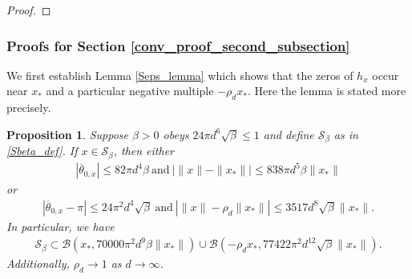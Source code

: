 \documentclass[11pt]{article}
\renewcommand{\epsilon}{\varepsilon}
\newcommand{\Seps}{\mathcal{S}}
\newtheorem{prop}{Proposition}
\theoremstyle{remark}
\begin{document}
\begin{proof}
\end{proof}



\subsubsection{Proofs for Section \ref{conv_proof_second_subsection}} \label{proofs_for_second_subsection}

We first establish Lemma \ref{Seps_lemma} which shows that the zeros of $h_x$ occur near $x_*$ and a particular negative multiple $-\rho_d x_*$. Here the lemma is stated more precisely. 

\begin{prop} \label{Seps} Suppose $\beta > 0$ obeys $24\pi d^6\sqrt{\beta}\leqslant 1$ and define $\Seps_{\beta}$ as in \eqref{Sbeta_def}.  If $x \in \Seps_{\beta}$, then either \begin{align*}
|\overline{\theta}_{0,x}| \leqslant 82 \pi d^4\beta\ \text{and}\ |\|x\| - \|x_*\|| \leqslant 838\pi d^5\beta\|x_*\|
\end{align*} or \begin{align*}
|\overline{\theta}_{0,x} - \pi|\leqslant 24\pi^2d^4\sqrt{\beta}\ \text{and}\ |\|x\| - \rho_d\|x_*\|| \leqslant 3517d^8\sqrt{\beta}\|x_*\|.
\end{align*} In particular, we have 
\begin{align*}
\Seps_{\beta} \subset \mathcal{B}(x_*,70000\pi^2 d^9\beta\|x_*\|) \cup \mathcal{B}(-\rho_d x_*, 77422\pi^2d^{12}\sqrt{\beta}\|x_*\|).
\end{align*} Additionally, $\rho_d \rightarrow 1$ as $d \rightarrow \infty$.
\end{prop}
\end{document}
